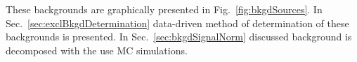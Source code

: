  These backgrounds are graphically presented in Fig.~\ref{fig:bkgdSources}. In Sec.~\ref{sec:exclBkgdDetermination} data-driven method of determination of these backgrounds is presented. In Sec.~\ref{sec:bkgdSignalNorm} discussed background is decomposed with the use MC simulations.

\begin{figure}[h]
\centering%
\parbox{0.315\textwidth}{%
  \centering%
  \begin{subfigure}[b]{0.9\linewidth}{
                }
  \end{subfigure}
}%
\quad%
\parbox{0.315\textwidth}{%
  \centering%
  \begin{subfigure}[b]{0.9\linewidth}{
                }
  \end{subfigure}
}
\end{figure}
